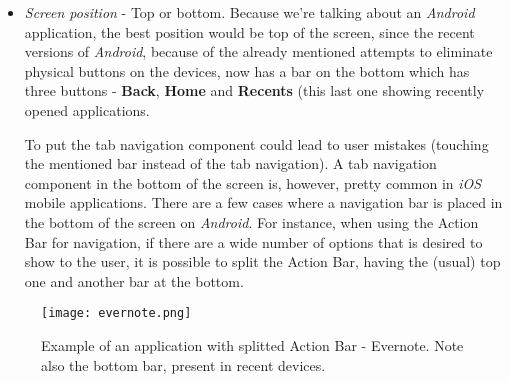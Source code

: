 \begin{itemize}
\item \emph{Screen position} - Top or bottom. Because we're talking about an \emph{Android} application, the best position would be top of the screen, since the recent versions of \emph{Android}, because of the already mentioned attempts to eliminate physical buttons on the devices, now has a bar on the bottom which has three buttons - \textbf{Back}, \textbf{Home} and \textbf{Recents} (this last one showing recently opened applications.

To put the tab navigation component could lead to user mistakes (touching the mentioned bar instead of the tab navigation). A tab navigation component in the bottom of the screen is, however, pretty common in \emph{iOS} mobile applications. 
There are a few cases where a navigation bar is placed in the bottom of the screen on \emph{Android}. For instance, when using the Action Bar for navigation, if there are a wide number of options that is desired to show to the user, it is possible to split the Action Bar, having the (usual) top one and another bar at the bottom. 


\end{itemize}

\begin{figure}[h!]
  \begin{center}
    \leavevmode
    \texttt{[image: evernote.png]}
    \caption{Example of an application with splitted Action Bar - Evernote. Note also the bottom bar, present in recent devices.}
    \label{fig:evernote}
  \end{center}
\end{figure}

